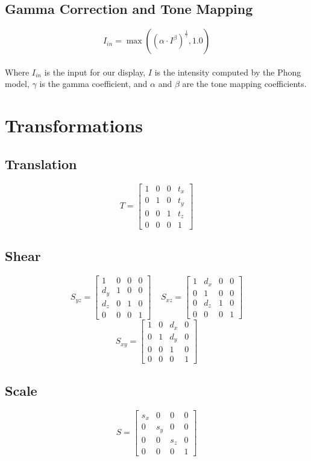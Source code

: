 \documentclass{article}
\begin{document}
\subsection{Gamma Correction and Tone Mapping}
\vspace{.3cm}
\[ I_{in} = \max((\alpha \cdot I^\beta)^{\frac{1}{\gamma}}, 1.0) \] \\
Where $I_{in}$ is the input for our display, $I$ is the intensity computed by the Phong model, $\gamma$ is the gamma coefficient, and $\alpha$ and $\beta$ are the tone mapping coefficients.

\section{Transformations}
\subsection{Translation}
\vspace{.3cm}
\[ T = \begin{bmatrix} 1 & 0 & 0 & t_x \\ 0 & 1 & 0 & t_y \\ 0 & 0 & 1 & t_z \\ 0 & 0 & 0 & 1 \end{bmatrix} \]

\subsection{Shear}
\vspace{.3cm}
\[ S_{yz} = \begin{bmatrix} 1 & 0 & 0 & 0 \\ d_y & 1 & 0 & 0 \\ d_z & 0 & 1 & 0 \\ 0 & 0 & 0 & 1 \end{bmatrix} ~~~~~ S_{xz} = \begin{bmatrix} 1 & d_x & 0 & 0 \\ 0 & 1 & 0 & 0 \\ 0 & d_z & 1 & 0 \\ 0 & 0 & 0 & 1 \end{bmatrix} \]
\[ S_{xy} = \begin{bmatrix} 1 & 0 & d_x & 0 \\ 0 & 1 & d_y & 0 \\ 0 & 0 & 1 & 0 \\ 0 & 0 & 0 & 1 \end{bmatrix} \]

\subsection{Scale}
\vspace{.3cm}
\[ S = \begin{bmatrix} s_x & 0 & 0 & 0 \\ 0 & s_y & 0 & 0 \\ 0 & 0 & s_z & 0 \\ 0 & 0 & 0 & 1 \end{bmatrix} \]
\end{document}
